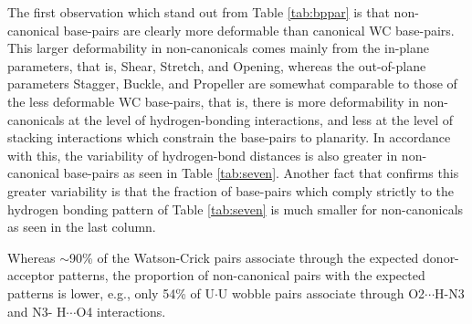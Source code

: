 The first  observation which stand  out from Table  \ref{tab:bppar} is
that  non-canonical   base-pairs  are  clearly   more  deformable  than
canonical WC base-pairs.   This larger deformability in non-canonicals
comes mainly  from the in-plane  parameters, that is,  Shear, Stretch,
and Opening,  whereas the out-of-plane parameters  Stagger, Buckle, and
Propeller are somewhat  comparable to those of the  less deformable WC
base-pairs, that is, there  is more deformability in non-canonicals at
the level of  hydrogen-bonding interactions, and less at  the level of
stacking    interactions   which    constrain   the    base-pairs   to
planarity. In  accordance with  this, the variability  of hydrogen-bond
distances is also greater in non-canonical base-pairs as seen in Table
\ref{tab:seven}. Another  fact that confirms  this greater variability
is  that the  fraction  of  base-pairs which  comply  strictly to  the
hydrogen bonding pattern of  Table \ref{tab:seven} is much smaller for
non-canonicals as seen in the last column.



Whereas   $\sim$90\%  of   the
Watson-Crick  pairs  associate  through  the  expected  donor-acceptor
patterns,  the proportion  of  non-canonical pairs  with the  expected
patterns is lower, e.g., only 54\% of U$\cdot$U wobble pairs associate
through O2$\cdots$H-N3  and N3- H$\cdots$O4 interactions.

